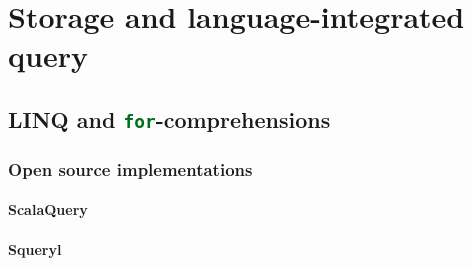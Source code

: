 \section{Storage and language-integrated query}

\subsection{LINQ and \lstinline[language=Scala]!for!-comprehensions}

\subsubsection{Open source implementations}

\paragraph{ScalaQuery}

\paragraph{Squeryl}